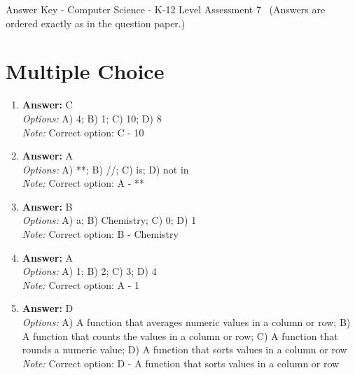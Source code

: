 \documentclass[12pt]{article}
\begin{document}
\begin{center}
Answer Key - Computer Science - K-12 Level Assessment 7 \
\small (Answers are ordered exactly as in the question paper.)
\end{center}

\section*{Multiple Choice}
\begin{enumerate}[label=\arabic*.]
\item \textbf{Answer:} C
\\ \textit{Options:} A) 4; B) 1; C) 10; D) 8
\\ \textit{Note:} Correct option: C - 10
\item \textbf{Answer:} A
\\ \textit{Options:} A) **; B) //; C) is; D) not in
\\ \textit{Note:} Correct option: A - **
\item \textbf{Answer:} B
\\ \textit{Options:} A) a; B) Chemistry; C) 0; D) 1
\\ \textit{Note:} Correct option: B - Chemistry
\item \textbf{Answer:} A
\\ \textit{Options:} A) 1; B) 2; C) 3; D) 4
\\ \textit{Note:} Correct option: A - 1
\item \textbf{Answer:} D
\\ \textit{Options:} A) A function that averages numeric values in a column or row; B) A function that counts the values in a column or row; C) A function that rounds a numeric value; D) A function that sorts values in a column or row
\\ \textit{Note:} Correct option: D - A function that sorts values in a column or row
\end{enumerate}
\end{document}
